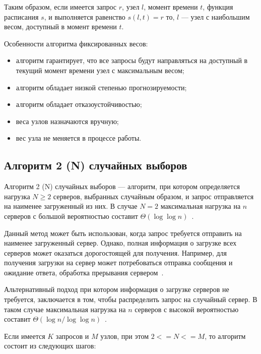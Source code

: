 Таким образом, если имеется запрос $r$, узел $l$, момент времени $t$, функция расписания $s$, и выполняется равенство $s(l, t) = r$ то, $l$ --- узел с наибольшим весом, доступный в момент времени $t$.

Особенности алгоритма фиксированных весов:
\begin{itemize}
	\item алгоритм гарантирует, что все запросы будут направляться на доступный в текущий момент времени узел с максимальным весом;
	\item алгоритм обладает низкой степенью прогнозируемости;
	\item алгоритм обладает отказоустойчивостью;
	\item веса узлов назначаются вручную;
	\item вес узла не меняется в процессе работы.
\end{itemize}

\subsection{Алгоритм 2 (N) случайных выборов}

Алгоритм 2 (N) случайных выборов --- алгоритм, при котором определяется нагрузка $N \ge 2$ серверов, выбранных случайным образом, и запрос отправляется на наименее загруженный из них. 
В случае $N=2$ максимальная нагрузка на $n$ серверов с большой вероятностью составит $\Theta(\log  \log n)$~\cite{pwr2choices}.

Данный метод может быть использован, когда запрос требуется отправить на наименее загруженный сервер. 
Однако, полная информация о загрузке всех серверов может оказаться дорогостоящей для получения. 
Например, для получения загрузки на сервер может потребоваться отправка сообщения и ожидание ответа, 
обработка прерывания сервером~\cite{pwr2choices}.

Альтернативный подход при котором информация о загрузке серверов не требуется, заключается в том, чтобы распределить запрос на случайный сервер.
В таком случае максимальная нагрузка на $n$ серверов с высокой вероятностью составит $\Theta(\log n / \log \log n)$~\cite{pwr2choices}.

Если имеется $K$ запросов и $M$ узлов, при этом $2 <= N <= M$, то алгоритм состоит из следующих шагов:

